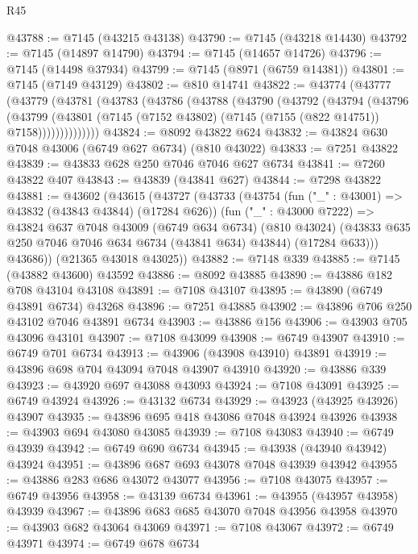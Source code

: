 \begin{lexlean}{R45}
\begin{coremodule}
{@43788 := @7145 (@43215 @43138)
@43790 := @7145 (@43218 @14430)
@43792 := @7145 (@14897 @14790)
@43794 := @7145 (@14657 @14726)
@43796 := @7145 (@14498 @37934)
@43799 := @7145 (@8971 (@6759 @14381))
@43801 := @7145 (@7149 @43129)
@43802 := @810 @14741
@43822 := @43774
    (@43777
      (@43779
        (@43781
          (@43783
            (@43786
              (@43788
                (@43790
                  (@43792
                    (@43794
                      (@43796
                        (@43799
                          (@43801
                            (@7145 (@7152 @43802) (@7145 (@7155 (@822 @14751)) @7158))))))))))))))
@43824 := @8092 @43822 @624
@43832 := @43824 @630 @7048 @43006 (@6749 @627 @6734) (@810 @43022)
@43833 := @7251 @43822
@43839 := @43833 @628 @250 @7046 @7046 @627 @6734
@43841 := @7260 @43822 @407
@43843 := @43839 (@43841 @627)
@43844 := @7298 @43822
@43881 := @43602
    (@43615
      (@43727
        (@43733
          (@43754
            (fun ("_" : @43001) => @43832 (@43843 @43844) (@17284 @626))
            (fun ("_" : @43000 @7222) =>
            @43824
              @637
              @7048
              @43009
              (@6749 @634 @6734)
              (@810 @43024)
              (@43833 @635 @250 @7046 @7046 @634 @6734 (@43841 @634) @43844)
              (@17284 @633)))
          @43686))
      (@21365 @43018 @43025))
@43882 := @7148 @339
@43885 := @7145 (@43882 @43600) @43592
@43886 := @8092 @43885
@43890 := @43886 @182 @708 @43104 @43108
@43891 := @7108 @43107
@43895 := @43890 (@6749 @43891 @6734) @43268
@43896 := @7251 @43885
@43902 := @43896 @706 @250 @43102 @7046 @43891 @6734
@43903 := @43886 @156
@43906 := @43903 @705 @43096 @43101
@43907 := @7108 @43099
@43908 := @6749 @43907
@43910 := @6749 @701 @6734
@43913 := @43906 (@43908 @43910) @43891
@43919 := @43896 @698 @704 @43094 @7048 @43907 @43910
@43920 := @43886 @339
@43923 := @43920 @697 @43088 @43093
@43924 := @7108 @43091
@43925 := @6749 @43924
@43926 := @43132 @6734
@43929 := @43923 (@43925 @43926) @43907
@43935 := @43896 @695 @418 @43086 @7048 @43924 @43926
@43938 := @43903 @694 @43080 @43085
@43939 := @7108 @43083
@43940 := @6749 @43939
@43942 := @6749 @690 @6734
@43945 := @43938 (@43940 @43942) @43924
@43951 := @43896 @687 @693 @43078 @7048 @43939 @43942
@43955 := @43886 @283 @686 @43072 @43077
@43956 := @7108 @43075
@43957 := @6749 @43956
@43958 := @43139 @6734
@43961 := @43955 (@43957 @43958) @43939
@43967 := @43896 @683 @685 @43070 @7048 @43956 @43958
@43970 := @43903 @682 @43064 @43069
@43971 := @7108 @43067
@43972 := @6749 @43971
@43974 := @6749 @678 @6734
}
\end{coremodule}
\end{lexlean}
